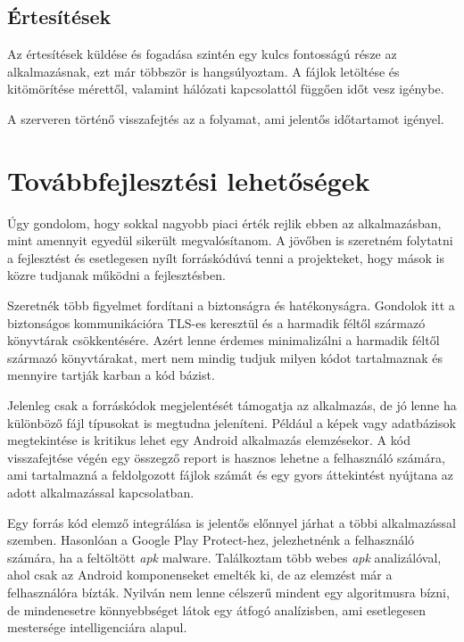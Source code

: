 \documentclass{thesis-ekf}
\theoremstyle{definition}
\theoremstyle{remark}
\begin{document}
\section{Értesítések}\label{ertesitesek}

Az értesítések küldése és fogadása szintén egy kulcs fontosságú része az alkalmazásnak, ezt már többször is hangsúlyoztam.
A fájlok letöltése és kitömörítése mérettől, valamint hálózati kapcsolattól függően időt vesz igénybe.

A szerveren történő visszafejtés az a folyamat, ami jelentős időtartamot igényel.

\chapter{Továbbfejlesztési lehetőségek}\label{lehetosegek}

Úgy gondolom, hogy sokkal nagyobb piaci érték rejlik ebben az alkalmazásban, mint amennyit egyedül sikerült megvalósítanom.
A jövőben is szeretném folytatni a fejlesztést és esetlegesen nyílt forráskódúvá tenni a projekteket, hogy mások is közre tudjanak működni a fejlesztésben.

Szeretnék több figyelmet fordítani a biztonságra és hatékonyságra. 
Gondolok itt a biztonságos kommunikációra TLS-es keresztül és a harmadik féltől származó könyvtárak csökkentésére.
Azért lenne érdemes minimalizálni a harmadik féltől származó könyvtárakat, mert nem mindig tudjuk milyen kódot tartalmaznak és mennyire tartják karban a kód bázist.

Jelenleg csak a forráskódok megjelentését támogatja az alkalmazás, de jó lenne ha különböző fájl típusokat is megtudna jeleníteni.
Például a képek vagy adatbázisok megtekintése is kritikus lehet egy Android alkalmazás elemzésekor.
A kód visszafejtése végén egy összegző report is hasznos lehetne a felhasználó számára, ami tartalmazná a feldolgozott fájlok számát és egy gyors áttekintést nyújtana az adott alkalmazással kapcsolatban.

Egy forrás kód elemző integrálása is jelentős előnnyel járhat a többi alkalmazással szemben. Hasonlóan a Google Play Protect-hez, jelezhetnénk a felhasználó számára, ha a feltöltött \emph{apk} malware.
Találkoztam több webes \emph{apk} analizálóval, ahol csak az Android komponenseket emelték ki, de az elemzést már a felhasználóra bízták.
Nyilván nem lenne célszerű mindent egy algoritmusra bízni, de mindenesetre könnyebbséget látok egy átfogó analízisben, ami esetlegesen mestersége intelligenciára alapul.
\end{document}

